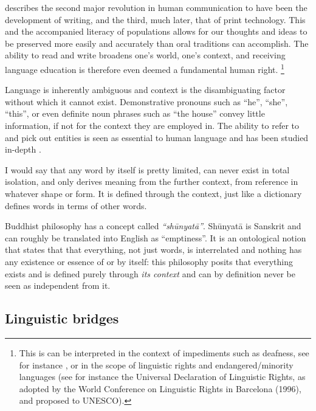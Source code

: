\cite{HARNAD91} describes the second major revolution in human communication to have been the development of writing,
and the third, much later, that of print technology. This and the accompanied literacy of
populations allows for our thoughts and ideas to be preserved more easily and
accurately than oral traditions can accomplish. The ability to read and write
broadens one's world, one's context, and receiving language education is
therefore even deemed a fundamental human right. \footnote{This is can be interpreted in the context of impediments such as
deafness, see for instance \cite{HUMPHRIES13}, or in the scope of linguistic rights and endangered/minority
languages (see for instance the Universal Declaration of Linguistic Rights, as adopted by the World Conference on
Linguistic Rights in Barcelona (1996), and proposed to UNESCO).}

Language is inherently ambiguous and context is the disambiguating factor without which it cannot exist. Demonstrative
pronouns such as ``he'', ``she'', ``this'', or even definite noun phrases such as ``the house'' convey little
information, if not for the context they are employed in. The ability to refer to and pick out entities is seen as
essential to human language and has been studied in-depth \citep{GUNDEL19}.

I would say that any word by itself is pretty limited, can never exist in total isolation, and only derives meaning from
the further context, from reference in whatever shape or form. It is defined through the context, just like a dictionary
defines words in terms of other words.

Buddhist philosophy has a concept called \emph{``sh\=unyat\=a''}. Sh\=unyat\=a is Sanskrit and can
roughly be translated into English as ``emptiness''. It is an ontological
notion that states that that everything, not just words, is interrelated and nothing has any
existence or essence of or by itself: this philosophy posits that everything
exists and is defined purely through \emph{its context} and can by definition
never be seen as independent from it.

\subsection*{Linguistic bridges}
\label{sec:bridges}

